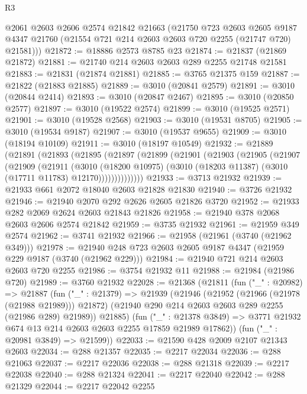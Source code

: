 \begin{lexlean}{R3}
\begin{coremodule}
      @2061
      @2603
      @2606
      @2574
      @21842
      @21663
      (@21750
        @723
        @2603
        @2605
        @9187
        @4347
        @21760
        (@21554 @721 @214 @2603 @2603 @720 @2255 (@21747 @720) @21581)))
@21872 := @18886 @2573 @8785 @23
@21874 := @21837 (@21869 @21872)
@21881 := @21740 @214 @2603 @2603 @289 @2255 @21748 @21581
@21883 := @21831 (@21874 @21881)
@21885 := @3765 @21375 @159
@21887 := @21822 (@21883 @21885)
@21889 := @3010 (@20841 @2579)
@21891 := @3010 (@20844 @2414)
@21893 := @3010 (@20847 @2467)
@21895 := @3010 (@20850 @2577)
@21897 := @3010 (@19522 @2574)
@21899 := @3010 (@19525 @2571)
@21901 := @3010 (@19528 @2568)
@21903 := @3010 (@19531 @8705)
@21905 := @3010 (@19534 @9187)
@21907 := @3010 (@19537 @9655)
@21909 := @3010 (@18194 @10109)
@21911 := @3010 (@18197 @10549)
@21932 := @21889
    (@21891
      (@21893
        (@21895
          (@21897
            (@21899
              (@21901
                (@21903
                  (@21905
                    (@21907
                      (@21909
                        (@21911
                          (@3010
                            (@18200 @10975)
                            (@3010 (@18203 @11387) (@3010 (@17711 @11783) @12170))))))))))))))
@21933 := @3713 @21932
@21939 := @21933 @661 @2072 @18040 @2603 @21828 @21830
@21940 := @3726 @21932
@21946 := @21940 @2070 @292 @2626 @2605 @21826 @3720
@21952 := @21933 @282 @2069 @2624 @2603 @21843 @21826
@21958 := @21940 @378 @2068 @2603 @2606 @2574 @21842
@21959 := @3735 @21932
@21961 := @21959 @349 @2574
@21962 := @3741 @21932
@21966 := @21958 (@21961 (@3740 (@21962 @349)))
@21978 := @21940 @248 @723 @2603 @2605 @9187 @4347 (@21959 @229 @9187 (@3740 (@21962 @229)))
@21984 := @21940 @721 @214 @2603 @2603 @720 @2255
@21986 := @3754 @21932 @11
@21988 := @21984 (@21986 @720)
@21989 := @3760 @21932
@22028 := @21368
    (@21811
      (fun ("_" : @20982) =>
      @21887
        (fun ("_" : @21379) =>
        @21939
          (@21946
            (@21952 (@21966 (@21978 (@21988 @21989))) @21872)
            (@21940 @290 @214 @2603 @2603 @289 @2255 (@21986 @289) @21989))
          @21885)
        (fun ("_" : @21378 @3849) =>
        @3771 @21932 @674 @13 @214 @2603 @2603 @2255 @17859 @21989 @17862))
      (fun ("_" : @20981 @3849) => @21599))
@22033 := @21590 @428 @2009 @2107 @21343 @2603
@22034 := @288 @21357
@22035 := @2217 @22034
@22036 := @288 @21063
@22037 := @2217 @22036
@22038 := @288 @21318
@22039 := @2217 @22038
@22040 := @288 @21324
@22041 := @2217 @22040
@22042 := @288 @21329
@22044 := @2217 @22042 @2255

\end{coremodule}
\end{lexlean}
